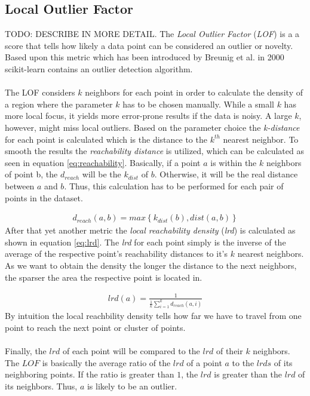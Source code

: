 \subsection{Local Outlier Factor}
\label{subsec:LocalOutlierFactor}
TODO: DESCRIBE IN MORE DETAIL.
The \textit{Local Outlier Factor} (\textit{LOF}) is a a score that tells how likely a data point can be considered an outlier or novelty. Based upon this metric which has been introduced by Breunig et al. in 2000 \cite{LOF} scikit-learn \cite{scikit-learn} contains an outlier detection algorithm. \\
\\
The LOF considers $k$ neighbors for each point in order to calculate the density of a region where the parameter $k$ has to be chosen manually. While a small $k$ has more local focus, it yields more error-prone results if the data is noisy. A large $k$, however, might miss local outliers. Based on the parameter choice the \textit{k-distance} for each point is calculated which is the distance to the $k^{th}$ nearest neighbor. To smooth the results the \textit{reachability distance} is utilized, which can be calculated as seen in equation \ref{eq:reachability}. Basically, if a point $a$ is within the $k$ neighbors of point b, the $d_{reach}$ will be the $k_{dist}$ of $b$. Otherwise, it will be the real distance between $a$ and $b$. Thus, this calculation has to be performed for each pair of points in the dataset.

\begin{align}
\label{eq:reachability}
d_{reach}(a,b)=max\left\lbrace k_{dist}(b), dist(a,b)\right\rbrace
\end{align}
After that yet another metric the \textit{local reachability density} (\textit{lrd}) is calculated as shown in equation \ref{eq:lrd}. The \textit{lrd} for each point simply is the inverse of the average of the respective point's reachability distances to it's $k$ nearest neighbors. As we want to obtain the density the longer the distance to the next neighbors, the sparser the area the respective point is located in. 

\begin{align}
\label{eq:lrd}
lrd(a)=\frac{1}{\frac{1}{k}\sum_{i=1}^k d_{reach}(a,i)}
\end{align}
By intuition the local reachbility density tells how far we have to travel from one point to reach the next point or cluster of points.\\
\\
Finally, the $lrd$ of each point will be compared to the $lrd$ of their $k$ neighbors. The $LOF$ is basically the average ratio of the $lrd$ of a point $a$ to the $lrds$ of its neighboring points. If the ratio is greater than $1$, the $lrd$ is greater than the $lrd$ of its neighbors. Thus, $a$ is likely to be an outlier. 

